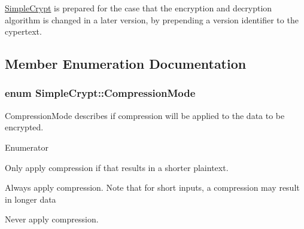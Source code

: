 \hyperlink{class_simple_crypt}{Simple\-Crypt} is prepared for the case that the encryption and decryption algorithm is changed in a later version, by prepending a version identifier to the cypertext. 

\subsection{Member Enumeration Documentation}
\hypertarget{class_simple_crypt_a25298e746f175cf175a18f082092ca8e}{
\subsubsection[{Compression\-Mode}]{\setlength{\rightskip}{0pt plus 5cm}enum {\bf Simple\-Crypt\-::\-Compression\-Mode}}}\label{class_simple_crypt_a25298e746f175cf175a18f082092ca8e}
Compression\-Mode describes if compression will be applied to the data to be encrypted. \begin{Desc}
\item[Enumerator]\par
\begin{description}
\item[{\em 
\hypertarget{class_simple_crypt_a25298e746f175cf175a18f082092ca8ea8d04b76ed73553456ec87e88b18ddc66}{Compression\-Auto}\label{class_simple_crypt_a25298e746f175cf175a18f082092ca8ea8d04b76ed73553456ec87e88b18ddc66}
}]Only apply compression if that results in a shorter plaintext. \item[{\em 
\hypertarget{class_simple_crypt_a25298e746f175cf175a18f082092ca8ea10aec29129f4e6d08c4f61d7008ec8f7}{Compression\-Always}\label{class_simple_crypt_a25298e746f175cf175a18f082092ca8ea10aec29129f4e6d08c4f61d7008ec8f7}
}]Always apply compression. Note that for short inputs, a compression may result in longer data \item[{\em 
\hypertarget{class_simple_crypt_a25298e746f175cf175a18f082092ca8eadc794d925e3af54dcef9a24ee3f60f6d}{Compression\-Never}\label{class_simple_crypt_a25298e746f175cf175a18f082092ca8eadc794d925e3af54dcef9a24ee3f60f6d}
}]Never apply compression. \end{description}
\end{Desc}
